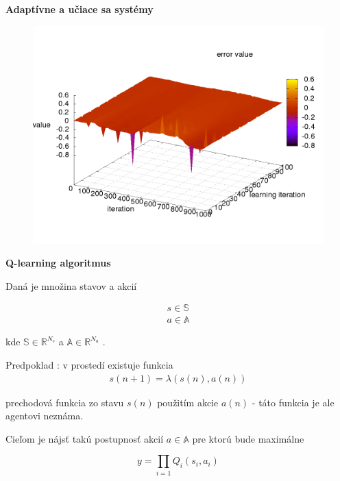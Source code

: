 \documentclass[xcolor=dvipsnames]{beamer}
\begin{document}
\begin{frame}{\bf Adaptívne a učiace sa systémy}
\begin{minipage}{.5\textwidth}
  \begin{figure}[!htb]
  \includegraphics[scale=.15]{../pid_ilc/ilc_result_plant_error.png}
  \end{figure}

\end{minipage}
\end{frame}


\begin{frame}{\bf Q-learning algoritmus}

Daná je množina stavov a akcií

\begin{align}
        s \in \mathbb{S} \nonumber\\
        a \in \mathbb{A} \nonumber
\end{align}

kde $\mathbb{S} \in \mathbb{R}^{N_s}$ a $\mathbb{A} \in \mathbb{R}^{N_a}$ .

Predpoklad : v prostedí existuje funkcia
\begin{align}
        s(n+1) = \lambda(s(n), a(n))
\end{align}

prechodová funkcia zo stavu $s(n)$ použitím akcie $a(n)$ - táto funkcia je ale agentovi neznáma.

Cieľom je nájsť takú postupnosť akcií $a \in \mathbb{A}$ pre ktorú bude maximálne

\begin{equation} \label{eu_eqn}
y = \prod_{i=1}Q_i(s_i, a_i)
\end{equation}



\end{frame}
\end{document}
